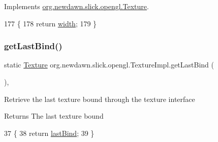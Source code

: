 Implements \mbox{\hyperlink{interfaceorg_1_1newdawn_1_1slick_1_1opengl_1_1_texture_a7dadcef354aaed97a0fe03f1978ee5f8}{org.\+newdawn.\+slick.\+opengl.\+Texture}}.


\begin{DoxyCode}
177                                \{
178         \textcolor{keywordflow}{return} \mbox{\hyperlink{classorg_1_1newdawn_1_1slick_1_1opengl_1_1_texture_impl_a73412d6372fabe2942ffa281f91a830c}{width}};
179     \}
\end{DoxyCode}
\mbox{\label{classorg_1_1newdawn_1_1slick_1_1opengl_1_1_texture_impl_a796a92e466d1f45d693ad4c39ebc8605}} 
\subsubsection{\texorpdfstring{get\+Last\+Bind()}{getLastBind()}}
{\footnotesize\ttfamily static \mbox{\hyperlink{interfaceorg_1_1newdawn_1_1slick_1_1opengl_1_1_texture}{Texture}} org.\+newdawn.\+slick.\+opengl.\+Texture\+Impl.\+get\+Last\+Bind (\begin{DoxyParamCaption}{ }\end{DoxyParamCaption})\hspace{0.3cm}{\ttfamily [inline]}, {\ttfamily [static]}}

Retrieve the last texture bound through the texture interface

\begin{DoxyReturn}{Returns}
The last texture bound 
\end{DoxyReturn}

\begin{DoxyCode}
37                                         \{
38         \textcolor{keywordflow}{return} \mbox{\hyperlink{classorg_1_1newdawn_1_1slick_1_1opengl_1_1_texture_impl_ae726e8066199fe500031c7058f3459c3}{lastBind}};
39     \}
\end{DoxyCode}
\mbox{\label{classorg_1_1newdawn_1_1slick_1_1opengl_1_1_texture_impl_a1420a28b8b562c79d6053c927cc58f20}} 
